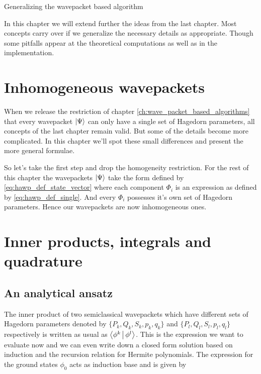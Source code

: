 \begin{chapter}{Generalizing the wavepacket based algorithm}
\label{ch:multi_family_algorithms}

In this chapter we will extend further the ideas from the last chapter. Most concepts
carry over if we generalize the necessary details as appropriate. Though some pitfalls
appear at the theoretical computations as well as in the implementation.

\section{Inhomogeneous wavepackets}

When we release the restriction of chapter \ref{ch:wave_packet_based_algorithms}
that every wavepacket $\Ket{\Psi}$ can only have a single set of Hagedorn parameters,
all concepts of the last chapter remain valid. But some of the details become more
complicated. In this chapter we'll spot these small differences and present the more
general formulae.

So let's take the first step and drop the homogeneity restriction. For the rest
of this chapter the wavepackets $\Ket{\Psi}$ take the form defined by \eqref{eq:hawp_def_state_vector}
where each component $\Phi_i$ is an expression as defined by \eqref{eq:hawp_def_single}.
And every $\Phi_i$ possesses it's own set of Hagedorn parameters. Hence our wavepackets
are now inhomogeneous ones.

\section{Inner products, integrals and quadrature}

\subsection{An analytical ansatz}

The inner product of two semiclassical wavepackets which have different sets
of Hagedorn parameters denoted by $\{P_k, Q_k, S_k, p_k, q_k\}$ and $\{P_l, Q_l, S_l, p_l, q_l\}$
respectively is written as usual as $\Braket{ \phi^k | \phi^l }$.
This is the expression we want to evaluate now and we can even write down
a closed form solution based on induction and the recursion relation for
Hermite polynomials. The expression for the ground states $\phi_0$ acts as
induction base and is given by



\end{chapter}
